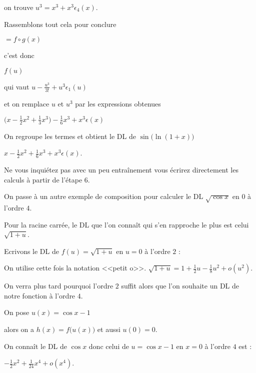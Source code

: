 \change 

on trouve $u^3=x^3+x^3\epsilon_4(x)$. 

\change

Rassemblons tout cela pour conclure 

$=f\circ g(x)$

\change

c'est donc

$f(u)$

\change

qui vaut $u-\frac{u^3}{3!}+u^3\epsilon_1(u)$

\change

et on remplace $u$ et $u^3$
par les expressions obtenues 

$\big(x-\frac{1}{2}x^{2}+\frac{1}{3}x^3\big) -\frac16 x^3  +x^3\epsilon(x)$

\change

On regroupe les termes et obtient le DL de $\sin\big(\ln(1+x)\big)$

$x-\frac{1}{2}x^{2}+\frac16 x^3  +x^3\epsilon(x)$. 

Ne vous inquiétez pas avec un peu entraînement vous écrirez directement les calculs 
à partir de l'étape $6$.


\diapo


On passe à un autre exemple de composition pour calculer le
DL $\sqrt{\cos x}$ en $0$ à l'ordre $4$. 

\change

Pour la racine carrée, le DL que l'on connaît qui s'en rapproche le plus 
est celui $\sqrt{1+u}$.

Ecrivons le DL de $f(u)=\sqrt{1+u}$ en $u=0$ à l'ordre $2$ :

\change

On utilise cette fois la notation <<petit o>>.
$\sqrt{1+u}=1+\frac{1}{2}u-\frac{1}{8}u^2 + o(u^2)$.

On verra plus tard pourquoi l'ordre $2$ suffit alors que l'on souhaite un DL de notre fonction à l'ordre $4$.


\change

On pose $u(x)=\cos x-1$ 

\change

alors on a $h(x)= f\big(u(x)\big)$ et aussi $u(0)=0$. 

\change

On connaît le DL de $\cos x$ donc celui de $u=\cos x -1$ en $x=0$ à l'ordre $4$ est :

$-\frac{1}{2}x^2+\frac{1}{24}x^4+o(x^4)$.

